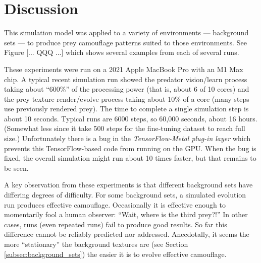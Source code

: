 \documentclass[acmtog]{acmart}
\newcommand{\jargon}[1]{\textit{#1}}
\begin{document}

\section{Discussion}
This simulation model was applied to a variety of environments — background sets — to produce prey camouflage patterns suited to those environments. See Figure [... QQQ ...] which shows several examples from each of several runs. 
\par
These experiments were run on a 2021 Apple MacBook Pro with an M1 Max chip. A typical recent simulation run showed the predator vision/learn process taking about “600\%” of the processing power (that is, about 6 of 10 cores) and the prey texture render/evolve process taking about 10\% of a core (many steps use previously rendered prey). The time to complete a single simulation step is about 10 seconds. Typical runs are 6000 steps, so 60,000 seconds, about 16 hours. (Somewhat less since it take 500 steps for the fine-tuning dataset to reach full size.) Unfortunately there is a bug in the \jargon{TensorFlow-Metal plug-in layer} which prevents this TensorFlow-based code from running on the GPU. When the bug is fixed, the overall simulation might run about 10 times faster, but that remains to be seen.
\par
A key observation from these experiments is that different background sets have differing degrees of difficulty. For some background sets, a simulated evolution run produces effective camouflage. Occasionally it is effective enough to momentarily fool a human observer: “Wait, where is the third prey?!” In other cases, runs (even repeated runs) fail to produce good results. So far this difference cannot be reliably predicted nor addressed. Anecdotally, it seems the more “stationary” the background textures are (see Section \ref{subsec:background_sets}) the easier it is to evolve effective camouflage.
\par
\end{document}
